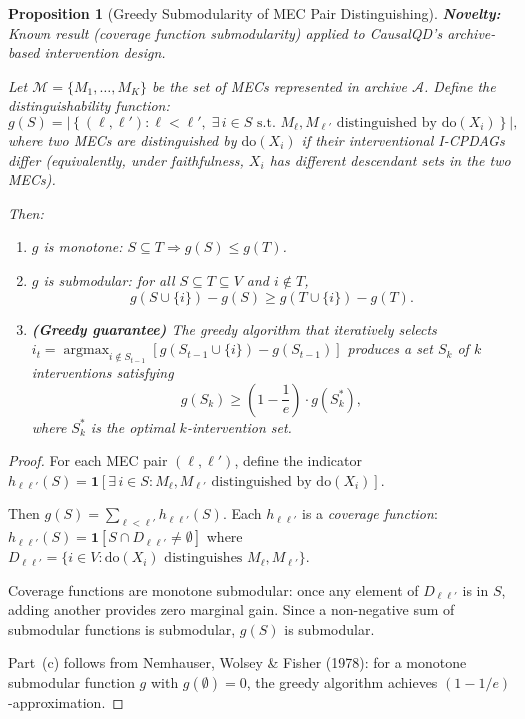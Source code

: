 \documentclass{article}
\theoremstyle{definition}
\theoremstyle{plain}
\newtheorem{proposition}{Proposition}
\theoremstyle{remark}
\DeclareMathOperator*{\argmax}{argmax}
\begin{document}
\begin{proposition}[Greedy Submodularity of MEC Pair Distinguishing]
\label{prop:greedy_submodularity}
\textbf{Novelty:} Known result (coverage function submodularity) applied to CausalQD's archive-based intervention design.

Let $\mathcal{M} = \{M_1, \ldots, M_K\}$ be the set of MECs represented in archive
$\mathcal{A}$. Define the distinguishability function:
\begin{equation}
g(S) = \left|\left\{(\ell, \ell') : \ell < \ell',\; \exists\, i \in S \text{ s.t. }
M_\ell, M_{\ell'} \text{ distinguished by } \mathrm{do}(X_i)\right\}\right|,
\end{equation}
where two MECs are \emph{distinguished by $\mathrm{do}(X_i)$} if their interventional
I-CPDAGs differ (equivalently, under faithfulness, $X_i$ has different descendant
sets in the two MECs).

Then:
\begin{enumerate}
  \item[(a)] $g$ is monotone: $S \subseteq T \Rightarrow g(S) \leq g(T)$.
  \item[(b)] $g$ is submodular: for all $S \subseteq T \subseteq V$ and $i \notin T$,
    \begin{equation}
      g(S \cup \{i\}) - g(S) \geq g(T \cup \{i\}) - g(T).
    \end{equation}
  \item[(c)] \textbf{(Greedy guarantee)} The greedy algorithm that iteratively selects
    $i_t = \argmax_{i \notin S_{t-1}} [g(S_{t-1} \cup \{i\}) - g(S_{t-1})]$
    produces a set $S_k$ of $k$ interventions satisfying
    \begin{equation}
      g(S_k) \geq \left(1 - \frac{1}{e}\right) \cdot g(S^*_k),
    \end{equation}
    where $S^*_k$ is the optimal $k$-intervention set.
\end{enumerate}
\end{proposition}

\begin{proof}
For each MEC pair $(\ell, \ell')$, define the indicator
$h_{\ell\ell'}(S) = \mathbf{1}[\exists\, i \in S : M_\ell, M_{\ell'} \text{ distinguished by } \mathrm{do}(X_i)]$.

Then $g(S) = \sum_{\ell < \ell'} h_{\ell\ell'}(S)$. Each $h_{\ell\ell'}$ is a
\emph{coverage function}: $h_{\ell\ell'}(S) = \mathbf{1}[S \cap D_{\ell\ell'} \neq \emptyset]$
where $D_{\ell\ell'} = \{i \in V : \mathrm{do}(X_i) \text{ distinguishes } M_\ell, M_{\ell'}\}$.

Coverage functions are monotone submodular: once any element of $D_{\ell\ell'}$ is
in $S$, adding another provides zero marginal gain. Since a non-negative sum of
submodular functions is submodular, $g(S)$ is submodular.

Part~(c) follows from Nemhauser, Wolsey \& Fisher (1978): for a monotone submodular
function $g$ with $g(\emptyset) = 0$, the greedy algorithm achieves
$(1 - 1/e)$-approximation.
\end{proof}
\end{document}
